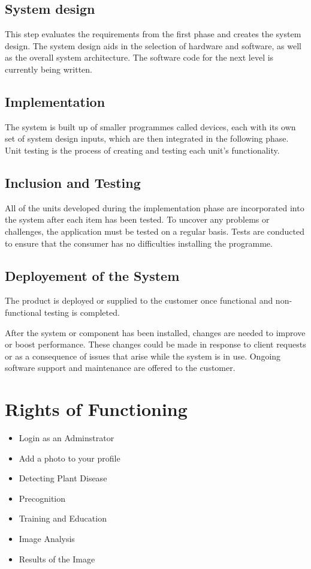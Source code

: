 \subsection{System design}
This step evaluates the requirements from the first phase and creates the system design. The system design aids in the selection of hardware and software, as well as the overall system architecture. The software code for the next level is currently being written.

\subsection{Implementation}
The system is built up of smaller programmes called devices, each with its own set of system design inputs, which are then integrated in the following phase. Unit testing is the process of creating and testing each unit's functionality.
\subsection{Inclusion and Testing}
All of the units developed during the implementation phase are incorporated into the system after each item has been tested. To uncover any problems or challenges, the application must be tested on a regular basis. Tests are conducted to ensure that the consumer has no difficulties installing the programme.
\subsection{Deployement of the System}
The product is deployed or supplied to the customer once functional and non-functional testing is completed.

After the system or component has been installed, changes are needed to improve or boost performance. These changes could be made in response to client requests or as a consequence of issues that arise while the system is in use. Ongoing software support and maintenance are offered to the customer.


\section{Rights of Functioning}

\begin{itemize}
\item Login as an Adminstrator
\item Add a photo to your profile
\item  Detecting Plant Disease
\item Precognition
\item Training and Education
\item Image Analysis 
\item Results of the Image
\end{itemize}

